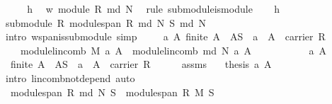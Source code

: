 \begin{isabellebody}
%
\isadelimproof
%
\endisadelimproof
%
\isatagproof
{}\isamarkupfalse%
\ {\isacharminus}\isanewline
\ \ \isamarkupfalse%
\ h{}\ \isamarkupfalse%
\ w{\isacharcolon}\ module\ R\ {\isachardoublequoteopen}{\isacharparenleft}md\ N{\isacharparenright}{\isachardoublequoteclose}\ \isamarkupfalse%
\ {\isacharparenleft}rule\ submodule{\isacharunderscore}is{\isacharunderscore}module{\isacharparenright}\isanewline
\ \ \isamarkupfalse%
\ h{}\ \isamarkupfalse%
\ {}{\isacharcolon}{\isachardoublequoteopen}submodule\ R\ {\isacharparenleft}module{\isachardot}span\ R\ {\isacharparenleft}md\ N{\isacharparenright}\ S{\isacharparenright}\ {\isacharparenleft}md\ N{\isacharparenright}{\isachardoublequoteclose}\ \isanewline
\ \ \ \ \isamarkupfalse%
\ {\isacharparenleft}intro\ w{\isachardot}span{\isacharunderscore}is{\isacharunderscore}submodule{\isacharcomma}\ simp{\isacharparenright}\isanewline
\ \ \isamarkupfalse%
\ {}{\isacharcolon}\ {\isachardoublequoteopen}{\isasymAnd}a\ A{\isachardot}\ {\isacharparenleft}finite\ A\ {\isasymand}\ A{\isasymsubseteq}S\ {\isasymand}\ a\ {\isasymin}\ A\ {\isasymrightarrow}\ carrier\ R\ {\isasymLongrightarrow}\ \isanewline
\ \ \ \ module{\isachardot}lincomb\ M\ a\ A\ {\isacharequal}\ module{\isachardot}lincomb\ {\isacharparenleft}md\ N{\isacharparenright}\ a\ A{\isacharparenright}{\isachardoublequoteclose}\isanewline
\ \ \isamarkupfalse%
\ {\isacharminus}\ \isanewline
\ \ \ \ \isamarkupfalse%
\ a\ A\isanewline
\ \ \ \ \isamarkupfalse%
\ {}{}{\isacharcolon}\ {\isachardoublequoteopen}finite\ A\ {\isasymand}\ A{\isasymsubseteq}S\ {\isasymand}\ a\ {\isasymin}\ A\ {\isasymrightarrow}\ carrier\ R{\isachardoublequoteclose}\isanewline
\ \ \ \ \isamarkupfalse%
\ assms\ {}{}\ \isamarkupfalse%
\ {\isachardoublequoteopen}{\isacharquery}thesis\ a\ A{\isachardoublequoteclose}\isanewline
\ \ \ \ \ \ \isamarkupfalse%
\ {\isacharparenleft}intro\ lincomb{\isacharunderscore}not{\isacharunderscore}depend{\isacharcomma}\ auto{\isacharparenright}\isanewline
\ \ \isamarkupfalse%
\isanewline
\ \ \isamarkupfalse%
\ {}\ \isamarkupfalse%
\ {}{\isacharcolon}\ {\isachardoublequoteopen}module{\isachardot}span\ R\ {\isacharparenleft}md\ N{\isacharparenright}\ S\ {\isacharequal}\ module{\isachardot}span\ R\ M\ S{\isachardoublequoteclose}\isanewline

\end{isabellebody}
